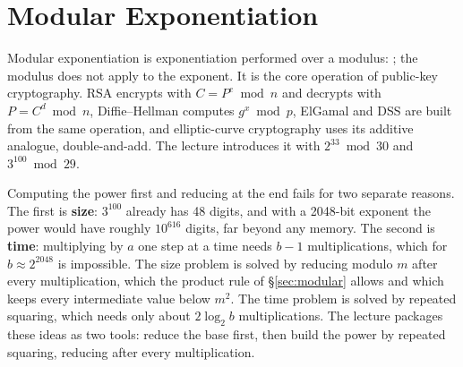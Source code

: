 \section{Modular Exponentiation \hot}\label{sec:modexp}

Modular exponentiation is exponentiation performed over a modulus: ; the modulus does not apply to the exponent. It is the core operation of public-key cryptography. RSA encrypts with $C = P^e \bmod n$ and decrypts with $P = C^d \bmod n$, Diffie--Hellman computes $g^x \bmod p$, ElGamal and DSS are built from the same operation, and elliptic-curve cryptography uses its additive analogue, double-and-add. The lecture introduces it with $2^{33} \bmod 30$ and $3^{100} \bmod 29$.

Computing the power first and reducing at the end fails for two separate reasons. The first is \textbf{size}: $3^{100}$ already has 48 digits, and with a 2048-bit exponent the power would have roughly $10^{616}$ digits, far beyond any memory. The second is \textbf{time}: multiplying by $a$ one step at a time needs $b - 1$ multiplications, which for $b \approx 2^{2048}$ is impossible. The size problem is solved by reducing modulo $m$ after every multiplication, which the product rule of \S\ref{sec:modular} allows and which keeps every intermediate value below $m^2$. The time problem is solved by repeated squaring, which needs only about $2\log_2 b$ multiplications. The lecture packages these ideas as two tools: reduce the base first, then build the power by repeated squaring, reducing after every multiplication.

